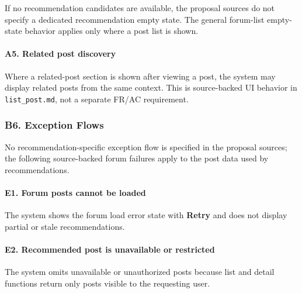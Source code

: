 \documentclass[12pt]{article}
\begin{document}
If no recommendation candidates are available, the proposal sources do not specify a dedicated recommendation empty state. The general forum-list empty-state behavior applies only where a post list is shown.
\par\medskip

\hypertarget{sec:a5-related-post-discovery}{}
\paragraph*{A5. Related post discovery}
\par\medskip

Where a related-post section is shown after viewing a post, the system may display related posts from the same context. This is source-backed UI behavior in \texttt{list\_post.md}, not a separate FR/AC requirement.
\par\medskip

\hypertarget{sec:b6-exception-flows}{}
\subsubsection*{B6. Exception Flows}
\par\medskip

No recommendation-specific exception flow is specified in the proposal sources; the following source-backed forum failures apply to the post data used by recommendations.
\par\medskip

\hypertarget{sec:e1-forum-posts-cannot-be-loaded}{}
\paragraph*{E1. Forum posts cannot be loaded}
\par\medskip

The system shows the forum load error state with \textbf{Retry} and does not display partial or stale recommendations.
\par\medskip

\hypertarget{sec:e2-recommended-post-is-unavailable-or-restricted}{}
\paragraph*{E2. Recommended post is unavailable or restricted}
\par\medskip

The system omits unavailable or unauthorized posts because list and detail functions return only posts visible to the requesting user.
\par\medskip
\end{document}
